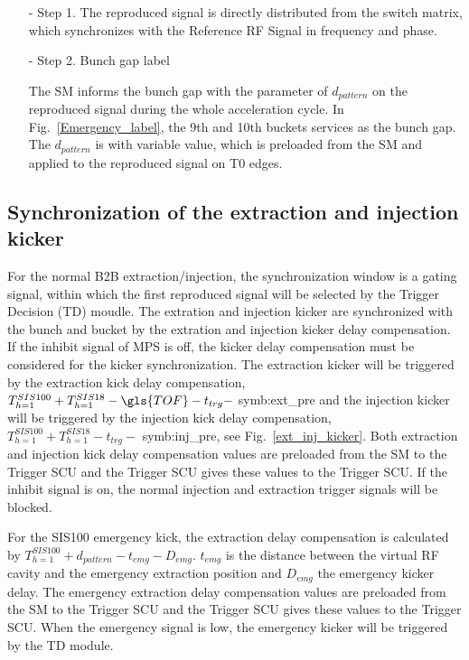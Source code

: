 \begin{itemize}
\begin{itemize}
\item[-] Step 1. The reproduced signal is directly distributed from the switch matrix, which synchronizes with the Reference RF Signal in frequency and phase.
\item[-] Step 2. Bunch gap label

The SM informs the bunch gap with the parameter of $d_{pattern}$ on the reproduced signal during the whole acceleration cycle. In Fig.~\ref{Emergency_label}, the 9th and 10th buckets services as the bunch gap. The $d_{pattern}$ is with variable value, which is preloaded from the SM and applied to the reproduced signal on T0 edges.

\end{itemize}

\end{itemize}

\subsection{Synchronization of the extraction and injection kicker}
For the normal B2B extraction/injection, the synchronization window is a gating signal, within which the first reproduced signal will be selected by the Trigger Decision (\gls{TD}) moudle. The extration and injection kicker are synchronized with the bunch and bucket by the extration and injection kicker delay compensation. If the inhibit signal of MPS is off, the kicker delay compensation must be considered for the kicker synchronization. The extraction kicker will be triggered by the extraction kick delay compensation, $T_{h=1}^{SIS100} + T_{h=1}^{SIS18} -\gls{TOF} - t_{trg} -$ \gls{symb:ext_pre} and the injection kicker will be triggered by the injection kick delay compensation, $T_{h=1}^{SIS100} + T_{h=1}^{SIS18} - t_{trg} -$ \gls{symb:inj_pre}, see Fig.~\ref{ext_inj_kicker}. Both extraction and injection kick delay compensation values are preloaded from the SM to the Trigger SCU and the Trigger SCU gives these values to the Trigger SCU. If the inhibit signal is on, the normal injection and extraction trigger signals will be blocked.

For the SIS100 emergency kick, the extraction delay compensation is calculated by $T_{h=1}^{SIS100} + d_{pattern} - t_{emg} - D_{emg}$. $t_{emg}$ is the distance between the virtual RF cavity and the emergency extraction position and $D_{emg}$ the emergency kicker delay. The emergency extraction delay compensation values are preloaded from the SM to the Trigger SCU and the Trigger SCU gives these values to the Trigger SCU. When the emergency signal is low, the emergency kicker will be triggered by the TD module.


